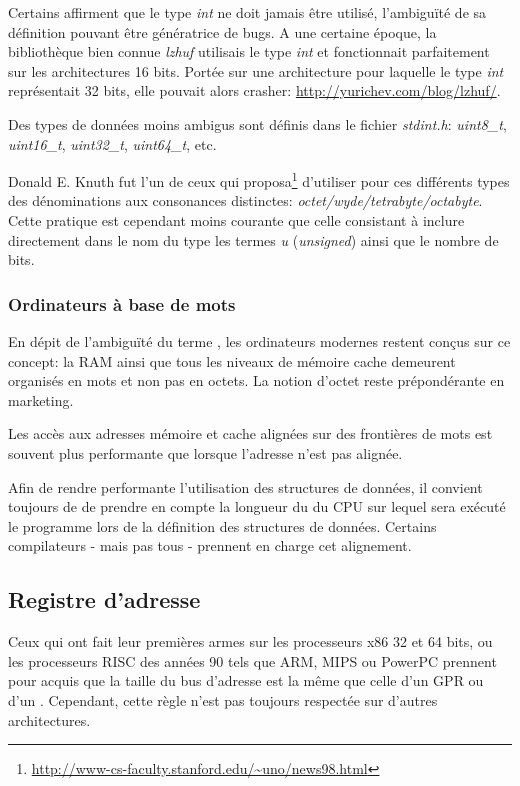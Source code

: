 Certains affirment que le type \emph{int} ne doit jamais être utilisé, l'ambiguïté de sa définition pouvant être génératrice de bugs.
A une certaine époque, la bibliothèque bien connue \emph{lzhuf} utilisais le type \emph{int} et fonctionnait parfaitement sur les architectures 16 bits.
Portée sur une architecture pour laquelle le type \emph{int} représentait 32 bits, elle pouvait alors crasher: \url{http://yurichev.com/blog/lzhuf/}.

Des types de données moins ambigus sont définis dans le fichier \emph{stdint.h}:
\emph{uint8\_t}, \emph{uint16\_t}, \emph{uint32\_t}, \emph{uint64\_t}, etc.

Donald E. Knuth fut l'un de ceux qui proposa\footnote{\url{http://www-cs-faculty.stanford.edu/~uno/news98.html}}
d'utiliser pour ces différents types des dénominations aux consonances distinctes: \emph{octet/wyde/tetrabyte/octabyte}.
Cette pratique est cependant moins courante que celle consistant à inclure directement dans le nom du type
les termes \emph{u} (\emph{unsigned}) ainsi que le nombre de bits.

\subsubsection{Ordinateurs à base de mots}

En dépit de l'ambiguïté du terme , les ordinateurs modernes restent conçus sur ce concept: la \ac{RAM} ainsi que tous
les niveaux de mémoire cache demeurent organisés en mots et non pas en octets.
La notion d'octet reste prépondérante en marketing.

Les accès aux adresses mémoire et cache alignées sur des frontières de mots est souvent plus performante que lorsque l'adresse n'est pas alignée.

Afin de rendre performante l'utilisation des structures de données, il convient toujours de de prendre en compte la longueur du
 du CPU sur lequel sera exécuté le programme lors de la définition des structures de données.
Certains compilateurs - mais pas tous - prennent en charge cet alignement.

\subsection{Registre d'adresse}

Ceux qui ont fait leur premières armes sur les processeurs x86 32 et 64 bits, ou les processeurs RISC des années 90
tels que ARM, MIPS ou PowerPC prennent pour acquis que la taille du bus d'adresse est la même que celle d'un \ac{GPR}
ou d'un .
Cependant, cette règle n'est pas toujours respectée sur d'autres architectures.

